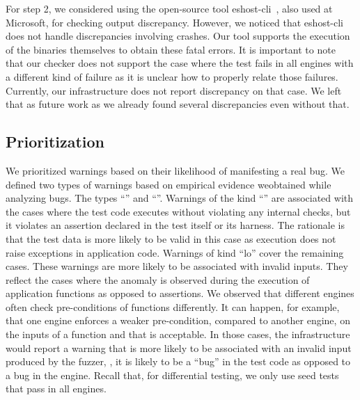 \documentclass[smallextended]{svjour3}
\begin{document}

For step 2, we considered using the open-source tool
eshost-cli~\cite{eshost-cli}, also used at Microsoft, for checking
output discrepancy. However, we noticed that eshost-cli does not
handle discrepancies involving crashes. Our tool supports the execution of the
binaries themselves to obtain these fatal errors.
It is important to note that our checker does not support the case where
the test fails in all engines with a different kind of failure as it
is unclear how to properly relate those failures. Currently, our
infrastructure does not report discrepancy on that case. We left that
as future work as we already found several discrepancies even without
that.




\subsection{Prioritization}
\label{sec:prioritization}

We prioritized warnings based on their likelihood of manifesting a
real bug. We defined two types of warnings based on empirical evidence
weobtained while analyzing bugs. The types ``\hi{}'' and
``\lo{}''. Warnings of the kind ``\hi{}'' are associated with the
cases where the test code executes without violating any internal
checks, but it violates an assertion declared in the test itself or
its harness. The rationale is that the test data is more likely to be
valid in this case as execution does not raise exceptions in
application code. Warnings of kind ``lo'' cover the remaining
cases. These warnings are more likely to be associated with invalid
inputs. They reflect the cases where the anomaly is observed during
the execution of application functions as opposed to assertions. We
observed that different engines often check pre-conditions of
functions differently. It can happen, for example, that one engine
enforces a weaker pre-condition, compared to another engine, on the
inputs of a function and that is acceptable. In those cases,
the infrastructure would report a warning that is more likely to be
associated with an invalid input produced by the fuzzer, \ie{}, it is
likely to be a ``bug'' in the test code as opposed to a bug in the
engine. Recall that, for differential testing, we only use seed tests
that pass in all engines.
\end{document}
